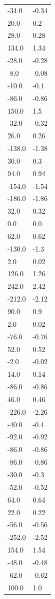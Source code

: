 \begin{longtable}{ll}
-34.0 & -0.34 \\
20.0 & 0.2 \\
28.0 & 0.28 \\
134.0 & 1.34 \\
-28.0 & -0.28 \\
-8.0 & -0.08 \\
-10.0 & -0.1 \\
-86.0 & -0.86 \\
150.0 & 1.5 \\
-32.0 & -0.32 \\
26.0 & 0.26 \\
-138.0 & -1.38 \\
30.0 & 0.3 \\
94.0 & 0.94 \\
-154.0 & -1.54 \\
-186.0 & -1.86 \\
32.0 & 0.32 \\
0.0 & 0.0 \\
62.0 & 0.62 \\
-130.0 & -1.3 \\
2.0 & 0.02 \\
126.0 & 1.26 \\
242.0 & 2.42 \\
-212.0 & -2.12 \\
90.0 & 0.9 \\
2.0 & 0.02 \\
-76.0 & -0.76 \\
52.0 & 0.52 \\
-2.0 & -0.02 \\
14.0 & 0.14 \\
-86.0 & -0.86 \\
46.0 & 0.46 \\
-226.0 & -2.26 \\
-40.0 & -0.4 \\
-92.0 & -0.92 \\
-86.0 & -0.86 \\
-86.0 & -0.86 \\
-30.0 & -0.3 \\
-52.0 & -0.52 \\
64.0 & 0.64 \\
22.0 & 0.22 \\
-56.0 & -0.56 \\
-252.0 & -2.52 \\
154.0 & 1.54 \\
-48.0 & -0.48 \\
-62.0 & -0.62 \\
100.0 & 1.0 \\

\end{longtable}
